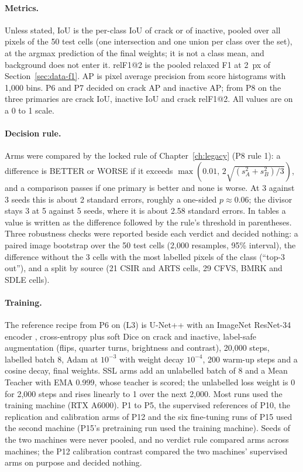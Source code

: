 \paragraph{Metrics.} Unless stated, IoU is the per-class IoU of crack or of inactive, pooled over all pixels of the 50 test cells
(one intersection and one union per class over the set), at the argmax prediction of the final weights; it is not a class mean,
and background does not enter it. relF1@2 is the pooled relaxed F1 at 2~px of Section~\ref{sec:data-f1}. AP is pixel average
precision from score histograms with 1,000 bins. P6 and P7 decided on crack AP and inactive AP; from P8 on the three primaries are
crack IoU, inactive IoU and crack relF1@2. All values are on a 0 to 1 scale.

\paragraph{Decision rule.} Arms were compared by the locked rule of Chapter~\ref{ch:legacy} (P8 rule 1): a difference is BETTER or
WORSE if it exceeds $\max(0.01,\, 2\sqrt{(s_A^2 + s_B^2)/3})$, and a comparison passes if one primary is better and none is worse.
At 3 against 3 seeds this is about 2 standard errors, roughly a one-sided $p \approx 0.06$; the divisor stays 3 at 5 against 5 seeds,
where it is about 2.58 standard errors. In tables a value is written as the difference followed by the rule's threshold in parentheses.
Three robustness checks were reported beside each verdict and decided nothing: a paired image bootstrap over the 50 test cells
(2,000 resamples, 95\% interval), the difference without the 3 cells with the most labelled pixels of the class
(``top-3 out''), and a split by source (21 CSIR and ARTS cells, 29 CFVS, BMRK and SDLE cells).

\paragraph{Training.} The reference recipe from P6 on (L3) is U-Net++ \citep{zhou2018unetpp} with an ImageNet ResNet-34 encoder
\citep{he2015resnet,iakubovskii2019smp}, cross-entropy plus soft Dice on crack and inactive, label-safe augmentation (flips, quarter
turns, brightness and contrast), 20,000 steps, labelled batch 8, Adam at $10^{-3}$ with weight decay $10^{-4}$, 200 warm-up steps and
a cosine decay, final weights. SSL arms add an unlabelled batch of 8 and a Mean Teacher \citep{tarvainen2017meanteacher} with
EMA 0.999, whose teacher is scored; the unlabelled loss weight is 0 for 2,000 steps and rises linearly to 1 over the next 2,000.
Most runs used the training machine (RTX A6000). P1 to P5, the supervised references of P10, the replication and calibration arms
of P12 and the six fine-tuning runs of P15 used the second machine (P15's pretraining run used the training machine). Seeds of the
two machines were never pooled, and no verdict rule compared arms across machines; the P12 calibration contrast compared the two
machines' supervised arms on purpose and decided nothing.

